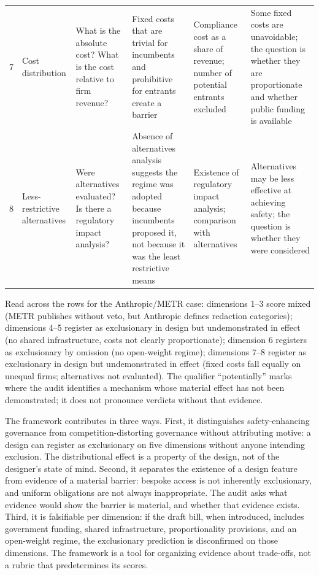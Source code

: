 \begin{table}[H]
\begin{tabularx}{\textwidth}{@{}c l X X X X@{}}
7 & Cost distribution & What is the absolute cost? What is the cost relative to firm revenue? & Fixed costs that are trivial for incumbents and prohibitive for entrants create a barrier & Compliance cost as a share of revenue; number of potential entrants excluded & Some fixed costs are unavoidable; the question is whether they are proportionate and whether public funding is available \\
8 & Less-restrictive alternatives & Were alternatives evaluated? Is there a regulatory impact analysis? & Absence of alternatives analysis suggests the regime was adopted because incumbents proposed it, not because it was the least restrictive means & Existence of regulatory impact analysis; comparison with alternatives & Alternatives may be less effective at achieving safety; the question is whether they were considered \\
\bottomrule
\end{tabularx}
\end{table}

Read across the rows for the Anthropic/METR case: dimensions 1--3 score mixed (METR publishes without veto, but Anthropic defines redaction categories); dimensions 4--5 register as exclusionary in design but undemonstrated in effect (no shared infrastructure, costs not clearly proportionate); dimension 6 registers as exclusionary by omission (no open-weight regime); dimensions 7--8 register as exclusionary in design but undemonstrated in effect (fixed costs fall equally on unequal firms; alternatives not evaluated). The qualifier ``potentially'' marks where the audit identifies a mechanism whose material effect has not been demonstrated; it does not pronounce verdicts without that evidence.

The framework contributes in three ways. First, it distinguishes safety-enhancing governance from competition-distorting governance without attributing motive: a design can register as exclusionary on five dimensions without anyone intending exclusion. The distributional effect is a property of the design, not of the designer's state of mind. Second, it separates the existence of a design feature from evidence of a material barrier: bespoke access is not inherently exclusionary, and uniform obligations are not always inappropriate. The audit asks what evidence would show the barrier is material, and whether that evidence exists. Third, it is falsifiable per dimension: if the draft bill, when introduced, includes government funding, shared infrastructure, proportionality provisions, and an open-weight regime, the exclusionary prediction is disconfirmed on those dimensions. The framework is a tool for organizing evidence about trade-offs, not a rubric that predetermines its scores.

